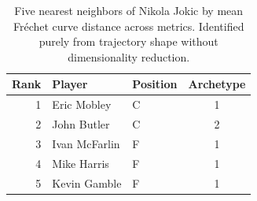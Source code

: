 \begin{table}[htbp]
  \centering\small
  \begin{tabular}{rllc}
    \toprule
    Rank & Player & Position & Archetype \\
    \midrule
    1 & Eric Mobley & C & 1 \\
    2 & John Butler & C & 2 \\
    3 & Ivan McFarlin & F & 1 \\
    4 & Mike Harris & F & 1 \\
    5 & Kevin Gamble & F & 1 \\
    \bottomrule
  \end{tabular}
  \caption{Five nearest neighbors of Nikola Jokic by mean Fr\'{e}chet curve distance across metrics. Identified purely from trajectory shape without dimensionality reduction.}
  \label{tab:Nikola_Jokic_frechet_curve_neighbors}
\end{table}

